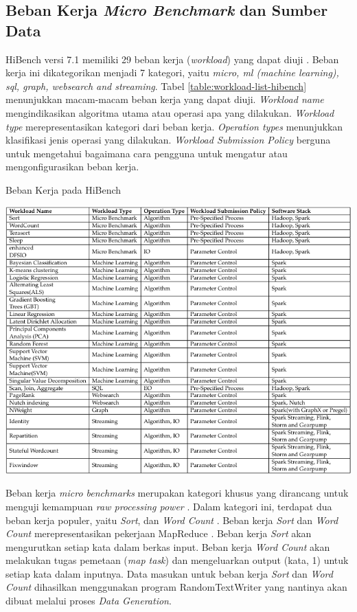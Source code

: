 \subsection{Beban Kerja \textit{Micro Benchmark} dan Sumber Data}
HiBench versi 7.1 memiliki 29 beban kerja (\textit{workload}) yang dapat diuji \cite{IntelbigdataHiBench2023}. Beban kerja ini dikategorikan menjadi 7 kategori, yaitu \textit{micro, ml (machine learning), sql, graph, websearch and streaming}. Tabel \ref{table:workload-list-hibench} menunjukkan macam-macam beban kerja yang dapat diuji. \textit{Workload name} mengindikasikan algoritma utama atau operasi apa yang dilakukan. \textit{Workload type} merepresentasikan kategori dari beban kerja. \textit{Operation types} menunjukkan klasifikasi jenis operasi yang dilakukan. \textit{Workload Submission Policy} berguna untuk mengetahui bagaimana cara pengguna untuk mengatur atau mengonfigurasikan beban kerja.

\begin{table}[h]
  \centering
  \caption{Beban Kerja pada HiBench \cite{barosenAnalysisComparisonInterfacing2018}}
  \includegraphics[width=1\textwidth]{figures/ch02/workload-hibench}
  \label{table:workload-list-hibench}
\end{table}

Beban kerja \textit{micro benchmarks} merupakan kategori khusus yang dirancang untuk menguji kemampuan \textit{raw processing power} \cite{barosenAnalysisComparisonInterfacing2018}. Dalam kategori ini, terdapat dua beban kerja populer, yaitu \textit{Sort}, dan \textit{Word Count} \cite{huangHiBenchBenchmarkSuitea}. Beban kerja \textit{Sort} dan \textit{Word Count} merepresentasikan pekerjaan MapReduce \cite{deanMapReduceSimplifiedData2004}. Beban kerja \textit{Sort} akan mengurutkan setiap kata dalam berkas input. Beban kerja \textit{Word Count} akan melakukan tugas pemetaan (\textit{map task}) dan mengeluarkan output (kata, 1) untuk setiap kata dalam inputnya.  Data masukan untuk beban kerja \textit{Sort} dan \textit{Word Count} dihasilkan menggunakan program RandomTextWriter yang nantinya akan dibuat melalui proses \textit{Data Generation}. 

